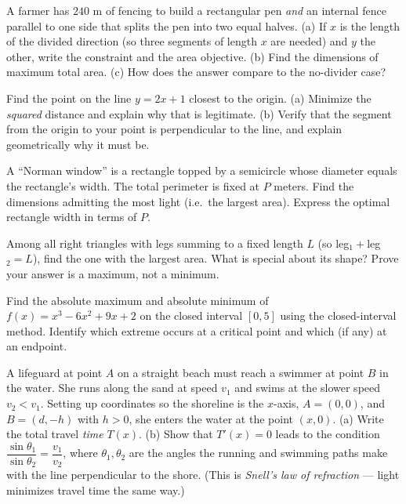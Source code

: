 \begin{exercise}
A farmer has $240$ m of fencing to build a rectangular pen \emph{and} an internal
fence parallel to one side that splits the pen into two equal halves. (a) If $x$ is
the length of the divided direction (so three segments of length $x$ are needed) and
$y$ the other, write the constraint and the area objective. (b) Find the dimensions of
maximum total area. (c) How does the answer compare to the no-divider case?
\end{exercise}

\begin{exercise}
Find the point on the line $y = 2x + 1$ closest to the origin. (a) Minimize the
\emph{squared} distance and explain why that is legitimate. (b) Verify that the
segment from the origin to your point is perpendicular to the line, and explain
geometrically why it must be.
\end{exercise}

\begin{exercise}
A ``Norman window'' is a rectangle topped by a semicircle whose diameter equals the
rectangle's width. The total perimeter is fixed at $P$ meters. Find the dimensions
admitting the most light (i.e.\ the largest area). Express the optimal rectangle width
in terms of $P$.
\end{exercise}

\begin{exercise}
Among all right triangles with legs summing to a fixed length $L$ (so leg$_1+$leg$_2
= L$), find the one with the largest area. What is special about its shape? Prove your
answer is a maximum, not a minimum.
\end{exercise}

\begin{exercise}
Find the absolute maximum and absolute minimum of $f(x) = x^3 - 6x^2 + 9x + 2$ on the
closed interval $[0,5]$ using the closed-interval method. Identify which extreme
occurs at a critical point and which (if any) at an endpoint.
\end{exercise}

\begin{exercise}
A lifeguard at point $A$ on a straight beach must reach a swimmer at point $B$ in the
water. She runs along the sand at speed $v_1$ and swims at the slower speed $v_2 <
v_1$. Setting up coordinates so the shoreline is the $x$-axis, $A=(0,0)$, and
$B=(d, -h)$ with $h>0$, she enters the water at the point $(x,0)$. (a) Write the total
travel \emph{time} $T(x)$. (b) Show that $T'(x)=0$ leads to the condition
$\dfrac{\sin\theta_1}{\sin\theta_2} = \dfrac{v_1}{v_2}$, where $\theta_1,\theta_2$ are
the angles the running and swimming paths make with the line perpendicular to the
shore. (This is \emph{Snell's law of refraction} --- light minimizes travel time the
same way.)
\end{exercise}

